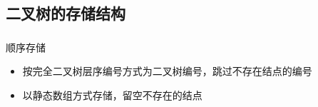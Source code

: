 \subsection{二叉树的存储结构}

\begin{frame}
    \frametitle{\insertsubsectionhead}
    \begin{block}{顺序存储}
        \begin{itemize}
            \item 按完全二叉树层序编号方式为二叉树编号，跳过不存在结点的编号
            \item 以静态数组方式存储，留空不存在的结点
        \end{itemize}
    \end{block}
\end{frame}

